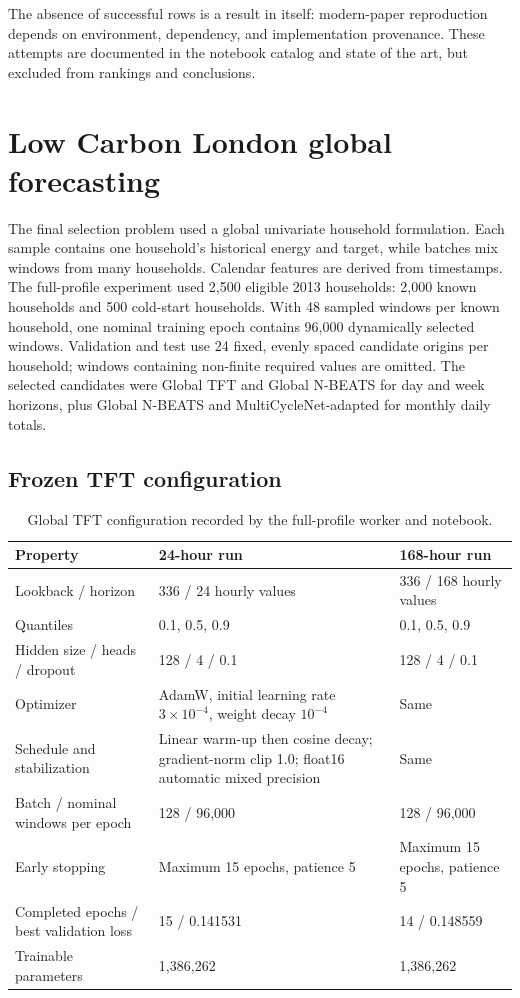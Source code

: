 The absence of successful rows is a result in itself: modern-paper reproduction depends on environment, dependency, and implementation provenance. These attempts are documented in the notebook catalog and state of the art, but excluded from rankings and conclusions.

\section{Low Carbon London global forecasting}

The final selection problem used a global univariate household formulation. Each sample contains one household's historical energy and target, while batches mix windows from many households. Calendar features are derived from timestamps. The full-profile experiment used 2,500 eligible 2013 households: 2,000 known households and 500 cold-start households. With 48 sampled windows per known household, one nominal training epoch contains 96,000 dynamically selected windows. Validation and test use 24 fixed, evenly spaced candidate origins per household; windows containing non-finite required values are omitted. The selected candidates were Global TFT and Global N-BEATS for day and week horizons, plus Global N-BEATS and MultiCycleNet-adapted for monthly daily totals.

\subsection{Frozen TFT configuration}

\begin{table}[H]
\centering
\caption{Global TFT configuration recorded by the full-profile worker and notebook.}
\label{tab:tftconfiguration}
\begin{tabularx}{\textwidth}{p{}YY}
\toprule
Property & 24-hour run & 168-hour run \\
\midrule
Lookback / horizon & 336 / 24 hourly values & 336 / 168 hourly values \\
Quantiles & 0.1, 0.5, 0.9 & 0.1, 0.5, 0.9 \\
Hidden size / heads / dropout & 128 / 4 / 0.1 & 128 / 4 / 0.1 \\
Optimizer & AdamW, initial learning rate $3\times10^{-4}$, weight decay $10^{-4}$ & Same \\
Schedule and stabilization & Linear warm-up then cosine decay; gradient-norm clip 1.0; float16 automatic mixed precision & Same \\
Batch / nominal windows per epoch & 128 / 96,000 & 128 / 96,000 \\
Early stopping & Maximum 15 epochs, patience 5 & Maximum 15 epochs, patience 5 \\
Completed epochs / best validation loss & 15 / 0.141531 & 14 / 0.148559 \\
Trainable parameters & 1,386,262 & 1,386,262 \\
\bottomrule
\end{tabularx}
\end{table}

